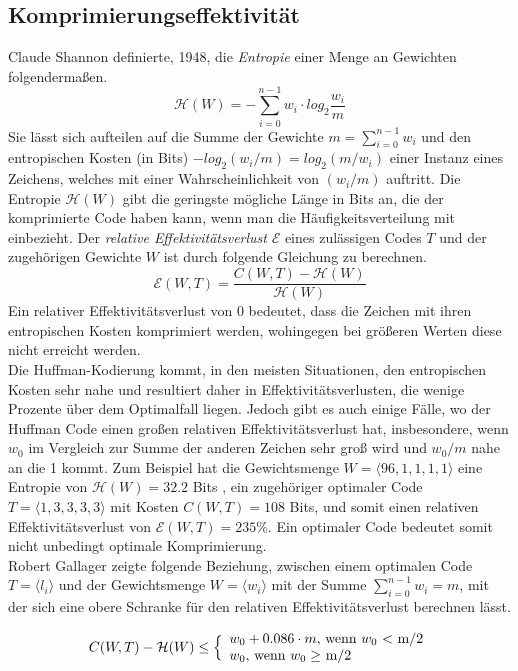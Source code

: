 \documentclass[course=erap]{aspdoc}
\begin{document}
\subsection{Komprimierungseffektivität}

Claude Shannon definierte, 1948, die \textit{Entropie} einer Menge an Gewichten folgendermaßen. \cite{6773024}
$$ \mathcal{H}(W) = - \sum_{i=0}^{n-1} w_i \cdot log_2 \frac{w_i}{m} $$
Sie lässt sich aufteilen auf die Summe der Gewichte $m = \sum_{i=0}^{n-1} w_i$ und den entropischen Kosten (in Bits) $-log_2 (w_i/m) = log_2 (m/w_i) $ einer Instanz eines Zeichens, welches mit einer Wahrscheinlichkeit von $(w_i/m)$ auftritt.
Die Entropie $\mathcal{H}(W)$ gibt die geringste mögliche Länge in Bits an, die der komprimierte Code haben kann, wenn man die Häufigkeitsverteilung mit einbezieht.
Der \textit{relative Effektivitätsverlust} $\mathcal{E}$ eines zulässigen Codes $T$ und der zugehörigen Gewichte $W$ ist durch folgende Gleichung zu berechnen.
$$ \mathcal{E}(W, T) = \frac{C(W,T) - \mathcal{H}(W)}{\mathcal{H}(W)} $$
Ein relativer Effektivitätsverlust von 0 bedeutet, dass die Zeichen mit ihren entropischen Kosten komprimiert werden, wohingegen bei größeren Werten diese nicht erreicht werden.\\
Die Huffman-Kodierung kommt, in den meisten Situationen, den entropischen Kosten sehr nahe und resultiert daher in Effektivitätsverlusten, die wenige Prozente über dem Optimalfall liegen.
Jedoch gibt es auch einige Fälle, wo der Huffman Code einen großen relativen Effektivitätsverlust hat, insbesondere, wenn $w_0$ im Vergleich zur Summe der anderen Zeichen sehr groß wird und $w_0 / m$ nahe an die 1 kommt.
Zum Beispiel hat die Gewichtsmenge $W = \langle 96, 1, 1, 1, 1 \rangle$ eine Entropie von $\mathcal{H}(W) =
32.2$ Bits , ein zugehöriger optimaler Code $T = \langle 1, 3, 3, 3, 3 \rangle$ mit Kosten $C(W ,T) = 108 $ Bits, und somit einen
relativen Effektivitätsverlust von $\mathcal{E}(W ,T ) = 235\%$. Ein optimaler Code bedeutet somit nicht unbedingt optimale Komprimierung.\\
Robert Gallager \cite{1055959} zeigte folgende Beziehung, zwischen einem optimalen Code $T = \langle l_i \rangle $ und der Gewichtsmenge $W = \langle w_i \rangle$ mit der Summe $\sum_{i=0}^{n-1} w_i = m$, mit der sich eine obere Schranke für den relativen Effektivitätsverlust berechnen lässt.

$$ C(W, T) - \mathcal{H}(W) \le \Bigl\lbrace
    \begin{array}{l}
          w_0 + 0.086 \cdot m \textrm{, wenn $w_0$ < m/2}\\
          w_0 \textrm{, wenn $w_0 \ge$ m/2}\\
    \end{array} $$
\end{document}
